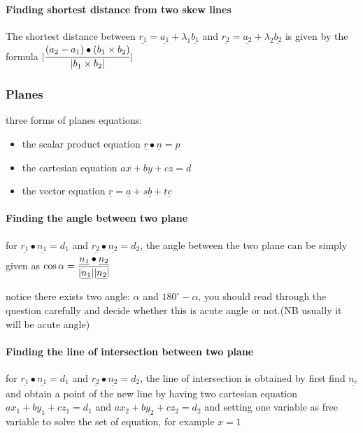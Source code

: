 \documentclass[]{article}
\let\oldparagraph\paragraph
\renewcommand{\paragraph}[1]{\oldparagraph{#1}\mbox{}}
\begin{document}
\paragraph{Finding shortest distance from two skew
lines}\label{header-n274}

The shortest distance between
\(\underline{r_1} = \underline{a_1}+\lambda_1 \underline{b_1}\) and
\(\underline{r_2} = \underline{a_2}+\lambda_2 \underline{b_2}\) is given
by the formula
\(|\cfrac{(a_2-a_1)\bullet(b_1\times b_2)}{|b_1 \times b_2|}|\)

\subsubsection{Planes}\label{header-n276}

three forms of planes equations:

\begin{itemize}
\item
  the scalar product equation \(\underline{r}\bullet\underline{n} = p\) 
\item
  the cartesian equation \(ax + by+ cz = d\)
\item
  the vector equation
  \(\underline{r} = \underline{a} + s\underline{b} + t\underline{c}\)
\end{itemize}

\paragraph{Finding the angle between two plane}\label{header-n285}

for \(\underline{r_1}\bullet\underline{n_1} = d_1\) and
\(\underline{r_2}\bullet\underline{n_2} = d_2\), the angle between the
two plane can be simply given as
\(\cos{\alpha} = \cfrac{\underline{n_1}\bullet\underline{n_2}}{|\underline{n_1}||\underline{n_2}|}\)

notice there exists two angle: \(\alpha\) and \(180^{\circ} - \alpha\),
you should read through the question carefully and decide whether this
is acute angle or not.(NB usually it will be acute angle)

\paragraph{Finding the line of intersection between two
plane}\label{header-n299}

for \(\underline{r_1}\bullet\underline{n_1} = d_1\) and
\(\underline{r_2}\bullet\underline{n_2} = d_2\), the line of
intersection is obtained by first find \(\underline{n_c}\) and obtain a
point of the new line by having two cartesian equation
\(ax_1 + by_1+ cz_1 = d_1\) and \(ax_2 + by_2+ cz_2 = d_2\) and setting
one variable as free variable to solve the set of equation, for example
\(x = 1\)
\end{document}
